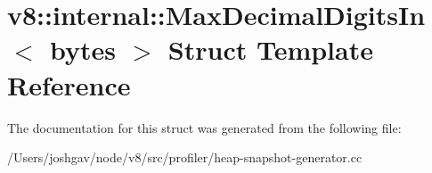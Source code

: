 \hypertarget{structv8_1_1internal_1_1_max_decimal_digits_in}{}\section{v8\+:\+:internal\+:\+:Max\+Decimal\+Digits\+In$<$ bytes $>$ Struct Template Reference}
\label{structv8_1_1internal_1_1_max_decimal_digits_in}


The documentation for this struct was generated from the following file\+:\begin{DoxyCompactItemize}
\item 
/\+Users/joshgav/node/v8/src/profiler/heap-\/snapshot-\/generator.\+cc\end{DoxyCompactItemize}
